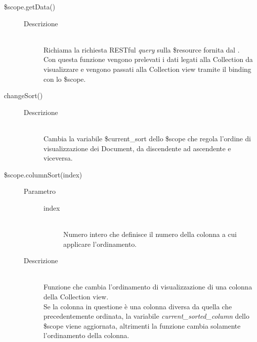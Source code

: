 \begin{description}
\begin{description}
  \item[\$scope.getData()] \hfill 
  \begin{description}
  		\item[Descrizione] \hfill \\
  Richiama la richiesta RESTful \textit{query} sulla \$resource fornita dal .
  Con questa funzione vengono prelevati i dati legati alla Collection da visualizzare e vengono
  passati alla Collection view tramite il binding con lo \$scope. 
  
  \end{description}
  
  \item[changeSort()] \hfill 
  \begin{description}
  	\item[Descrizione] \hfill \\
  Cambia la variabile \$current\_sort dello \$scope che regola l'ordine di visualizzazione dei Document, da discendente ad ascendente e viceversa.
  \end{description}
  
  \item[\$scope.columnSort(index)] \hfill
  \begin{description}
  	\item[Parametro] \hfill
  	\begin{description}
  		\item[index] \hfill \\
  		Numero intero che definisce il numero della colonna a cui applicare l'ordinamento.
  	\end{description}
  	\item[Descrizione] \hfill \\
  Funzione che cambia l'ordinamento di visualizzazione di una colonna della Collection view. \\
  Se la colonna in questione è una colonna diversa da quella che precedentemente ordinata, la variabile \textit{current\_sorted\_column} dello \$scope viene aggiornata, altrimenti la funzione cambia solamente l'ordinamento della colonna.
  \end{description}  
  

\end{description}
\end{description}
